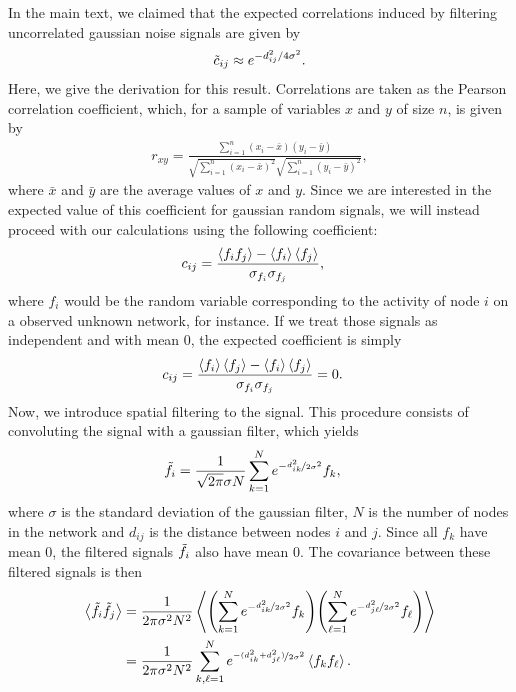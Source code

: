 \documentclass{article}
\begin{document}
In the main text, we claimed that the expected correlations induced by filtering uncorrelated gaussian noise signals are given by
\begin{align*}
    \Tilde{c}_{ij} \approx e^{-d_{ij}^2/4\sigma^2}.
\end{align*}
Here, we give the derivation for this result. Correlations are taken as the Pearson correlation coefficient,  which, for a sample of variables $x$ and $y$ of size $n$, is given by
\begin{align*}
    r_{xy} = \frac{\sum_{i=1}^n(x_i-\bar{x})(y_i-\bar{y})}{\sqrt{\sum ^n _{i=1}(x_i - \bar{x})^2} \sqrt{\sum ^n _{i=1}(y_i - \bar{y})^2}},
\end{align*}
where $\bar{x}$ and $\bar{y}$ are the average values of $x$ and $y$. Since we are interested in the expected value of this coefficient for gaussian random signals, we will instead proceed with our calculations using the following coefficient:
\begin{align}
    c_{ij} &= \frac{\expval{f_if_j}-\expval{f_i}\expval{f_j}}{\sigma_{f_i}\sigma_{f_j}},
    \label{eq:exp_coefficient}
\end{align}
where $f_i$ would be the random variable corresponding to the activity of node $i$ on a observed unknown network, for instance. If we treat those signals as independent and with mean $0$, the expected coefficient is simply
\begin{align*}
    c_{ij} &= \frac{\expval{f_i}\expval{f_j}-\expval{f_i}\expval{f_j}}{\sigma_{f_i}\sigma_{f_j}} = 0.
\end{align*}
Now, we introduce spatial filtering to the signal. This procedure consists of convoluting the signal with a gaussian filter, which yields
\begin{align*}
    \Tilde{f}_i &= \frac{1}{\sqrt{2\pi}\sigma N}\sum_{k=1}^N e^{-\nicefrac{d_{ik}^2}{2\sigma^2}}f_k,
\end{align*}
where $\sigma$ is the standard deviation of the gaussian filter, $N$ is the number of nodes in the network and $d_{ij}$ is the distance between nodes $i$ and $j$. Since all $f_k$ have mean $0$, the filtered signals $\Tilde{f}_i$ also have mean $0$. The covariance between these filtered signals is then
\begin{align*}
    \expval{\Tilde{f}_i\Tilde{f}_j} &= \frac{1}{2\pi\sigma^2N^2}\expval{\qty(\sum_{k=1}^N e^{-\nicefrac{d_{ik}^2}{2\sigma^2}}f_k)\qty(\sum_{\ell=1}^N e^{-\nicefrac{d_{j\ell}^2}{2\sigma^2}}f_\ell)}\\
    &= \frac{1}{2\pi\sigma^2N^2}\sum_{k, \ell =1}^N e^{\nicefrac{-(d_{ik}^2+d_{j\ell}^2)}{2\sigma^2}}\expval{f_kf_\ell}.
\end{align*}
\end{document}
